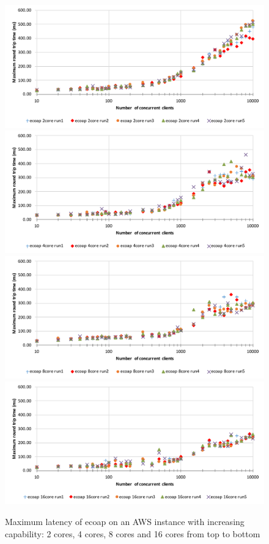 \begin{figure}[!htbp]
\centering
\includegraphics[scale=0.6]{ecoap_max_latency_2cores}
\includegraphics[scale=0.6]{ecoap_max_latency_4cores}
\includegraphics[scale=0.6]{ecoap_max_latency_8cores}
\includegraphics[scale=0.6]{ecoap_max_latency_16cores}
\caption[Maximum latency of ecoap on an AWS instance with increasing capability]{Maximum latency of ecoap on an AWS instance with increasing capability: 2 cores, 4 cores, 8 cores and 16 cores from top to bottom}
\label{fig:ecoap_max_latency}
\end{figure}

